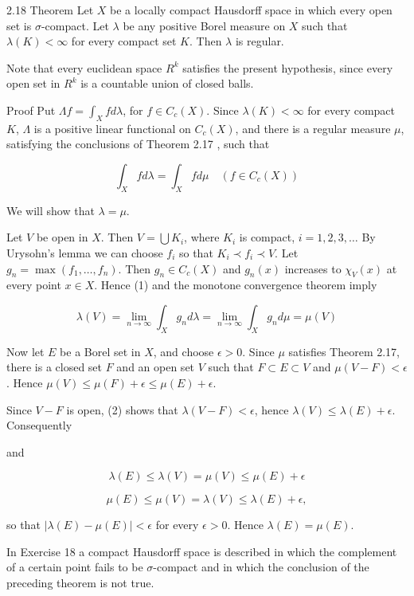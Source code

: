 \documentclass[10pt]{article}
\begin{document}
2.18 Theorem Let $X$ be a locally compact Hausdorff space in which every open set is $\sigma$-compact. Let $\lambda$ be any positive Borel measure on $X$ such that $\lambda(K)<\infty$ for every compact set $K$. Then $\lambda$ is regular.

Note that every euclidean space $R^{k}$ satisfies the present hypothesis, since every open set in $R^{k}$ is a countable union of closed balls.

Proof Put $\Lambda f=\int_{X} f d \lambda$, for $f \in C_{c}(X)$. Since $\lambda(K)<\infty$ for every compact $K$, $\Lambda$ is a positive linear functional on $C_{c}(X)$, and there is a regular measure $\mu$, satisfying the conclusions of Theorem 2.17 , such that

$$
\int_{X} f d \lambda=\int_{X} f d \mu \quad\left(f \in C_{c}(X)\right)
$$

We will show that $\lambda=\mu$.

Let $V$ be open in $X$. Then $V=\bigcup K_{i}$, where $K_{i}$ is compact, $i=1,2,3, \ldots$ By Urysohn's lemma we can choose $f_{i}$ so that $K_{i} \prec f_{i} \prec V$. Let $g_{n}=\max \left(f_{1}, \ldots, f_{n}\right)$. Then $g_{n} \in C_{c}(X)$ and $g_{n}(x)$ increases to $\chi_{V}(x)$ at every point $x \in X$. Hence (1) and the monotone convergence theorem imply

$$
\lambda(V)=\lim _{n \rightarrow \infty} \int_{X} g_{n} d \lambda=\lim _{n \rightarrow \infty} \int_{X} g_{n} d \mu=\mu(V)
$$

Now let $E$ be a Borel set in $X$, and choose $\epsilon>0$. Since $\mu$ satisfies Theorem 2.17, there is a closed set $F$ and an open set $V$ such that $F \subset E \subset V$ and $\mu(V-F)<\epsilon$. Hence $\mu(V) \leq \mu(F)+\epsilon \leq \mu(E)+\epsilon$.

Since $V-F$ is open, (2) shows that $\lambda(V-F)<\epsilon$, hence $\lambda(V) \leq \lambda(E)+\epsilon$. Consequently

and

$$
\lambda(E) \leq \lambda(V)=\mu(V) \leq \mu(E)+\epsilon
$$

$$
\mu(E) \leq \mu(V)=\lambda(V) \leq \lambda(E)+\epsilon,
$$

so that $|\lambda(E)-\mu(E)|<\epsilon$ for every $\epsilon>0$. Hence $\lambda(E)=\mu(E)$.

In Exercise 18 a compact Hausdorff space is described in which the complement of a certain point fails to be $\sigma$-compact and in which the conclusion of the preceding theorem is not true.
\end{document}
